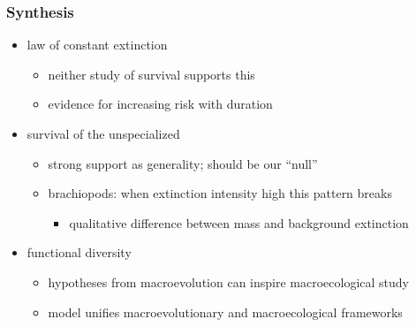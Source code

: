 \documentclass{beamer}
\begin{document}
\begin{frame}
  \frametitle{Synthesis}

  \begin{itemize}
    \item<1-> \alert{law of constant extinction}
      \begin{itemize}
        \item neither study of survival supports this
        \item evidence for increasing risk with duration
      \end{itemize}
    \item<2-> \alert{survival of the unspecialized}
      \begin{itemize}
        \item strong support as generality; should be our ``null''
        \item brachiopods: when extinction intensity high this pattern breaks
          \begin{itemize}
            \item qualitative difference between mass and background extinction
          \end{itemize}
      \end{itemize}
    \item<3-> \alert{functional diversity}
      \begin{itemize}
        \item hypotheses from macroevolution can inspire macroecological study
        \item model unifies macroevolutionary and macroecological frameworks
      \end{itemize}
  \end{itemize}
\end{frame}


\end{document}
